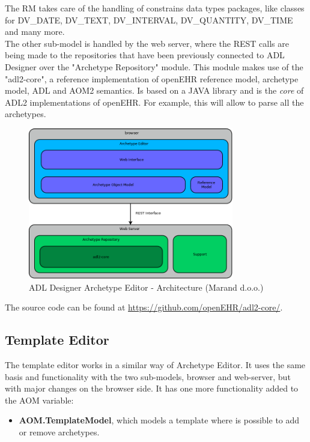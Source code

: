 \documentclass[mim_thesis.tex]{subfiles}
\begin{document}
The RM takes care of the handling of constrains data types packages, like classes for DV\_DATE, DV\_TEXT, DV\_INTERVAL, DV\_QUANTITY, DV\_TIME and many more. \\ 

The other sub-model is handled by the web server, where the REST calls are being made to the repositories that have been previously connected to ADL Designer over the "Archetype Repository" module. This module makes use of the "adl2-core", a reference implementation of openEHR reference model, archetype model, ADL and AOM2 semantics. Is based on a JAVA library and is the \textit{core} of ADL2 implementations of openEHR. For example, this will allow to parse all the archetypes. \\

\begin{figure}[H]
	\centering
    \includegraphics[width=0.80\textwidth]{img/archetype-editor-architecture.png}
	\caption{ADL Designer Archetype Editor - Architecture (Marand d.o.o.)}
	\label{fig:archetypeEditorArchitecture}
\end{figure}

The source code can be found at \url{https://github.com/openEHR/adl2-core/}. 

\newpage
\subsection{Template Editor}

The template editor works in a similar way of Archetype Editor. It uses the same basis and functionality with the two sub-models, browser and web-server, but with major changes on the browser side. It has one more functionality added to the AOM variable: 
\begin{itemize}[noitemsep]
\item \textbf{AOM.TemplateModel}, which models a template where is possible to add or remove archetypes.
\end{itemize}
\end{document}
